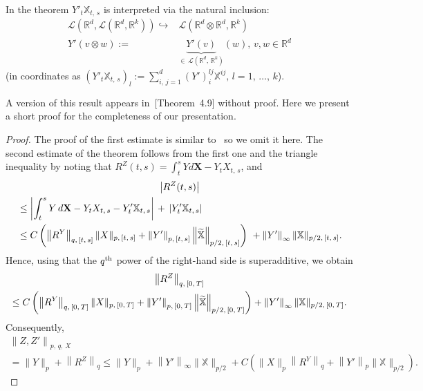 \documentclass[AHL,Unicode,longabstracts,published]{cedram}
\newcommand{\bfX}{\mathbf{X}}
\newcommand{\bbX}{\mathbb{X}}
\newcommand{\calL}{\mathcal{L}}
\newcommand{\Rr}{{\mathbb{R}}}
\let\oldtilde\tilde
\renewcommand*{\tilde}[1]{\mathchoice{\widetilde{#1}}{\widetilde{#1}}{\oldtilde{#1}}{\oldtilde{#1}}}
\begin{document}
In the theorem $Y'_t\bbX_{t,\,s}$ is interpreted via the natural inclusion:
\begin{align*}
\calL\left(\Rr^d,\calL\left(\Rr^d,\Rr^k\right)\right) \hookrightarrow& \calL\left(\Rr^d\otimes\Rr^d,\Rr^k\right)\\
Y'(v\otimes w) :=& \underbrace{Y'(v)}_{\in\,\calL\left(\Rr^d,\,\Rr^k\right)} (w),\, v, w \in \Rr^d
\end{align*}
(in coordinates as $(Y'_t\bbX_{t,\,s})_l:=\sum_{i,\,j=1}^d (Y')^{l j}_i\bbX^{i j},\, l=1,\,\ldots,\,k$).

A version of this result appears in~\cite{perkowski2015b}[Theorem~4.9] without proof. Here we present a short proof for the completeness of our presentation.
\vspace{6pt}
\pagebreak
\begin{proof}
The proof of the first estimate is similar to~\cite[Theorem~31]{FritzShekhar} so we omit it here. The second estimate of the theorem follows from the first one and the triangle inequality by noting that ${R^Z(t,s)}=\int_t^s Yd\bfX-Y_tX_{t,\,s}$, and
\begin{multline}\label{eq:RZ}
\left|R^Z(t,s)\right|\\
\begin{aligned}
&\leq \left|\int_t^s Y\, d\bfX-Y_tX_{t,\,s}-Y'_t\bbX_{t,\,s}\right|\,+\,\left|Y'_t\bbX_{t,\,s}\right|\\
&\leq C\left(\left\|{R}^Y\right\|_{q,\,[t,\,s]}\|X\|_{p,\,[t,\,s]}+\left\|Y'\right\|_{p,\,[t,\,s]}\left\|\tilde{\bbX}\right\|_{p/2,\,[t,\,s]}\right)\ +\left\|Y'\right\|_{\infty}\|\bbX\|_{p/2,\,[t,\,s]}.
\end{aligned}
\end{multline}
Hence, using that the $q^{\rm th}$ power of the right-hand side is superadditive, we obtain
\begin{multline*}
\left\|R^Z\right\|_{q,\,[0,\,T]}\\
\leq C \left(\left\|{R}^Y\right\|_{q,\,[0,\,T]}\|X\|_{p,\,[0,\,T]}+\left\|Y'\right\|_{p,\,[0,\,T]}\left\|\tilde{\bbX}\right\|_{p/2,\,[0,\,T]}\right) +\left\|Y'\right\|_{\infty}\|\bbX\|_{p/2,\,[0,\,T]}.
\end{multline*}
Consequently,
\begin{multline*}
\left\|Z,Z'\right\|_{p,\,q,\,X}\\
=\|Y\|_{p}+\left\|R^Z\right\|_{q}
\leq \|Y\|_{p}+\left\|Y'\right\|_{\infty}\|\bbX\|_{p/2}
+C\left(\|X\|_{p}\left\|R^{Y}\right\|_{q}+\left\|Y'\right\|_{p}\|\bbX\|_{p/2}\right).
\end{multline*}
\end{proof}
\end{document}
